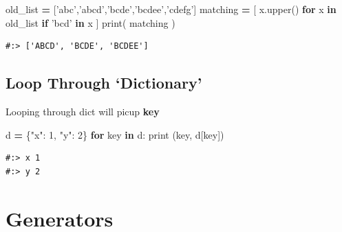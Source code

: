 \documentclass[
]{book}
\newenvironment{Shaded}{\begin{snugshade}}{\end{snugshade}}
\newcommand{\BuiltInTok}[1]{#1}
\newcommand{\ControlFlowTok}[1]{\textcolor[rgb]{0.27,0.27,0.27}{\textbf{#1}}}
\newcommand{\DecValTok}[1]{\textcolor[rgb]{0.06,0.06,0.06}{#1}}
\newcommand{\KeywordTok}[1]{\textcolor[rgb]{0.27,0.27,0.27}{\textbf{#1}}}
\newcommand{\NormalTok}[1]{#1}
\newcommand{\OperatorTok}[1]{\textcolor[rgb]{0.43,0.43,0.43}{\textbf{#1}}}
\newcommand{\StringTok}[1]{\textcolor[rgb]{0.5,0.5,0.5}{#1}}
\begin{document}
\begin{Shaded}
\begin{Highlighting}[]
\NormalTok{old_list    }\OperatorTok{=}\NormalTok{ [}\StringTok{'abc'}\NormalTok{,}\StringTok{'abcd'}\NormalTok{,}\StringTok{'bcde'}\NormalTok{,}\StringTok{'bcdee'}\NormalTok{,}\StringTok{'cdefg'}\NormalTok{]}
\NormalTok{matching }\OperatorTok{=}\NormalTok{ [ x.upper() }\ControlFlowTok{for}\NormalTok{ x }\KeywordTok{in}\NormalTok{ old_list }\ControlFlowTok{if} \StringTok{'bcd'} \KeywordTok{in}\NormalTok{ x ]}
\BuiltInTok{print}\NormalTok{( matching )}
\end{Highlighting}
\end{Shaded}

\begin{verbatim}
#:> ['ABCD', 'BCDE', 'BCDEE']
\end{verbatim}

\hypertarget{loop-through-dictionary}{%
\subsection{Loop Through `Dictionary'}\label{loop-through-dictionary}}

Looping through dict will picup \textbf{key}

\begin{Shaded}
\begin{Highlighting}[]
\NormalTok{d }\OperatorTok{=}\NormalTok{ \{}\StringTok{"x"}\NormalTok{: }\DecValTok{1}\NormalTok{, }\StringTok{"y"}\NormalTok{: }\DecValTok{2}\NormalTok{\}}
\ControlFlowTok{for}\NormalTok{ key }\KeywordTok{in}\NormalTok{ d:}
    \BuiltInTok{print}\NormalTok{ (key, d[key])}
\end{Highlighting}
\end{Shaded}

\begin{verbatim}
#:> x 1
#:> y 2
\end{verbatim}

\hypertarget{generators}{%
\section{Generators}\label{generators}}
\end{document}
